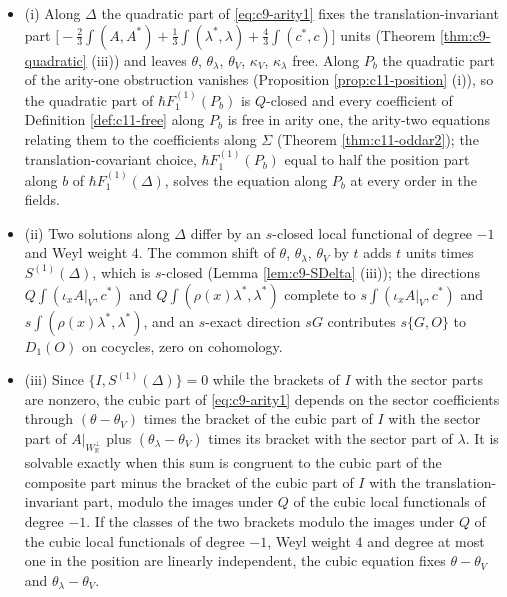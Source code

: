 \begin{proposition}
\label{prop:c11-arity1}
\begin{itemize}
\item (i) Along $\Delta$ the quadratic part of \eqref{eq:c9-arity1} fixes the translation-invariant part $\big[-\tfrac23\int(A,A^*)+\tfrac13\int(\lambda^*,\lambda)+\tfrac43\int(c^*,c)\big]$ units (Theorem \ref{thm:c9-quadratic} (iii)) and leaves $\theta$, $\theta_\lambda$, $\theta_V$, $\kappa_V$, $\kappa_\lambda$ free. Along $P_b$ the quadratic part of the arity-one obstruction vanishes (Proposition \ref{prop:c11-position} (i)), so the quadratic part of $\hbar F_1^{(1)}(P_b)$ is $Q$-closed and every coefficient of Definition \ref{def:c11-free} along $P_b$ is free in arity one, the arity-two equations relating them to the coefficients along $\Sigma$ (Theorem \ref{thm:c11-oddar2}); the translation-covariant choice, $\hbar F_1^{(1)}(P_b)$ equal to half the position part along $b$ of $\hbar F_1^{(1)}(\Delta)$, solves the equation along $P_b$ at every order in the fields.
\item (ii) Two solutions along $\Delta$ differ by an $s$-closed local functional of degree $-1$ and Weyl weight $4$. The common shift of $\theta$, $\theta_\lambda$, $\theta_V$ by $t$ adds $t$ units times $S^{(1)}(\Delta)$, which is $s$-closed (Lemma \ref{lem:c9-SDelta} (iii)); the directions $Q\int(\iota_xA|_V,c^*)$ and $Q\int(\rho(x)\lambda^*,\lambda^*)$ complete to $s\int(\iota_xA|_V,c^*)$ and $s\int(\rho(x)\lambda^*,\lambda^*)$, and an $s$-exact direction $sG$ contributes $s\{G,O\}$ to $D_1(O)$ on cocycles, zero on cohomology.
\item (iii) Since $\{I,S^{(1)}(\Delta)\}=0$ while the brackets of $I$ with the sector parts are nonzero, the cubic part of \eqref{eq:c9-arity1} depends on the sector coefficients through $(\theta-\theta_V)$ times the bracket of the cubic part of $I$ with the sector part of $A|_{W_{\mathbb R}^\perp}$ plus $(\theta_\lambda-\theta_V)$ times its bracket with the sector part of $\lambda$. It is solvable exactly when this sum is congruent to the cubic part of the composite part minus the bracket of the cubic part of $I$ with the translation-invariant part, modulo the images under $Q$ of the cubic local functionals of degree $-1$. If the classes of the two brackets modulo the images under $Q$ of the cubic local functionals of degree $-1$, Weyl weight $4$ and degree at most one in the position are linearly independent, the cubic equation fixes $\theta-\theta_V$ and $\theta_\lambda-\theta_V$.
\end{itemize}
\end{proposition}

